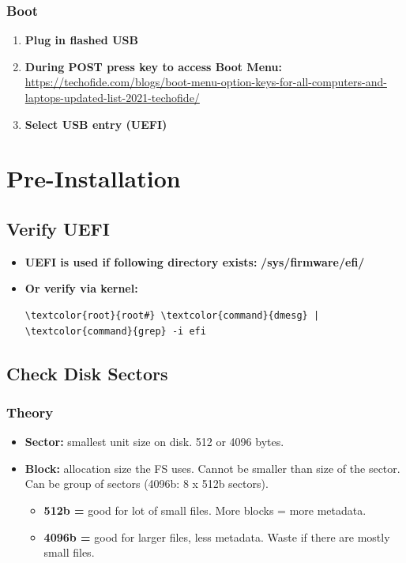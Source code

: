 \documentclass[10pt, a4paper, onecolumn, oneside, titlepage, openany]{book}
\begin{document}
\subsection{Boot}
\begin{enumerate}
    \item \textbf{Plug in flashed USB}
    \item \textbf{During POST press key to access Boot Menu:}
\newline \href{https://techofide.com/blogs/boot-menu-option-keys-for-all-computers-and-laptops-updated-list-2021-techofide/}{https://techofide.com/blogs/boot-menu-option-keys-for-all-computers-and-laptops-updated-list-2021-techofide/}
    \item \textbf{Select USB entry (UEFI)}
\end{enumerate}


\chapter{Pre-Installation}
\section{Verify UEFI}
\begin{itemize}
    \item \textbf{UEFI is used if following directory exists:}
\newline \textbf{\textcolor{dir}{/sys/firmware/efi/}}
    \item \textbf{Or verify via kernel:}
\begin{Verbatim}[commandchars=\\\{\}]
\textcolor{root}{root#} \textcolor{command}{dmesg} | \textcolor{command}{grep} -i efi
\end{Verbatim}
\end{itemize}

\section{Check Disk Sectors}
\subsection{Theory}
\begin{itemize}
    \item \textbf{Sector:} smallest unit size on disk. 512 or 4096 bytes.
    \item \textbf{Block:} allocation size the FS uses. Cannot be smaller than size of the sector. Can be group of sectors (4096b: 8 x 512b sectors).
    \begin{itemize}
        \item \textbf{512b =} good for lot of small files. More blocks = more metadata.
        \item \textbf{4096b =}  good for larger files, less metadata. Waste if there are mostly small files.
    \end{itemize}
\end{itemize}
\end{document}

